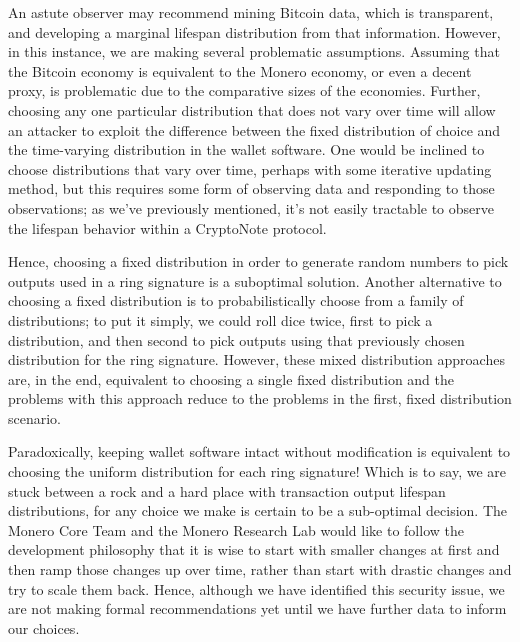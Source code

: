 \documentclass[12pt,english]{mrl}
\theoremstyle{definition}
\numberwithin{equation}{section}
\numberwithin{figure}{section}
\numberwithin{equation}{section}
\numberwithin{equation}{section}
\numberwithin{figure}{section}
\begin{document}
An astute observer may recommend mining Bitcoin data, which is transparent, and developing a marginal lifespan distribution from that information. However, in this instance, we are making several problematic assumptions. Assuming that the Bitcoin economy is equivalent to the Monero economy, or even a decent proxy, is problematic due to the comparative sizes of the economies. Further, choosing any one particular distribution that does not vary over time will allow an attacker to exploit the difference between the fixed distribution of choice and the time-varying distribution in the wallet software. One would be inclined to choose distributions that vary over time, perhaps with some iterative updating method, but this requires some form of observing data and responding to those observations; as we've previously mentioned, it's not easily tractable to observe the lifespan behavior within a CryptoNote protocol.

Hence, choosing a fixed distribution in order to generate random numbers to pick outputs used in a ring signature is a suboptimal solution. Another alternative to choosing a fixed distribution is to probabilistically choose from a family of distributions; to put it simply, we could roll dice twice, first to pick a distribution, and then second to pick outputs using that previously chosen distribution for the ring signature. However, these mixed distribution approaches are, in the end, equivalent to choosing a single fixed distribution and the problems with this approach reduce to the problems in the first, fixed distribution scenario.

Paradoxically, keeping wallet software intact without modification is equivalent to choosing the uniform distribution for each ring signature! Which is to say, we are stuck between a rock and a hard place with transaction output lifespan distributions, for any choice we make is certain to be a sub-optimal decision. The Monero Core Team and the Monero Research Lab would like to follow the development philosophy that it is wise to start with smaller changes at first and then ramp those changes up over time, rather than start with drastic changes and try to scale them back. Hence, although we have identified this security issue, we are not making formal recommendations yet until we have further data to inform our choices.
\end{document}
